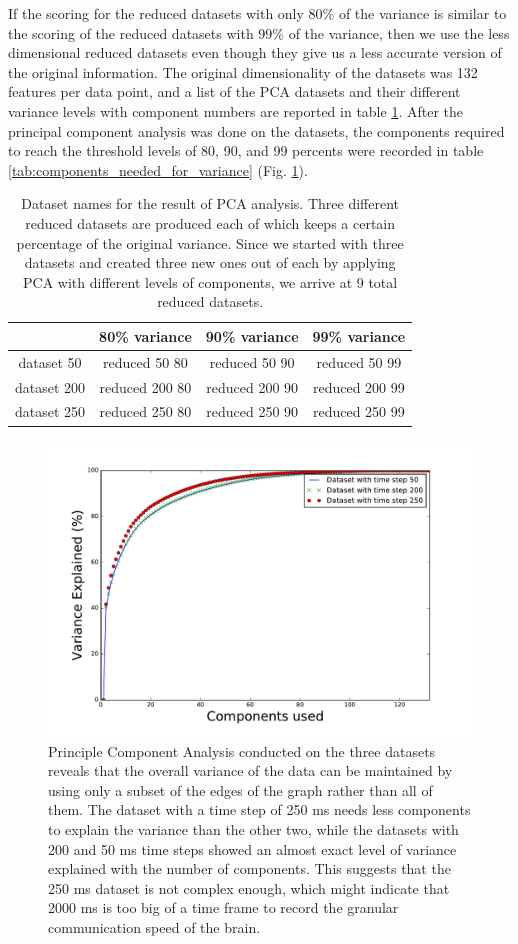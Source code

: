 \documentclass[journal,12pt,onecolumn,draftclsnofoot]{IEEEtran}  %
\begin{document}
 If the scoring for the reduced datasets with only 80\% of the variance is similar to the scoring of the reduced datasets with 99\% of the variance, then we use the less dimensional reduced datasets even though they give us a less accurate version of the original information. The original dimensionality of the datasets was 132 features per data point, and a list of the PCA datasets and their different variance levels with component numbers are reported in table \ref{tab:pca_datasets}. After the principal component analysis was done on the datasets, the components required to reach the threshold levels of 80, 90, and 99 percents were recorded in table \ref{tab:components_needed_for_variance} (Fig. \ref{fig:pca_analysis_variance}).


\begin{table}[H]
\centering
\caption{Dataset names for the result of PCA analysis. Three different reduced datasets are produced each of which keeps a certain percentage of the original variance. Since we started with three datasets and created three new ones out of each by applying PCA with different levels of components, we arrive at 9 total reduced datasets.}
\label{tab:pca_datasets}
\begin{tabular}{|c|c|c|c|}
\hline
  &  80\% variance &  90\% variance & 99\% variance \\ \hline
 
dataset 50 & reduced 50 80 & reduced 50 90 & reduced 50 99  \\ \hline
dataset 200 & reduced 200 80 & reduced 200 90 & reduced 200 99  \\ \hline
dataset 250 & reduced 250 80 & reduced 250 90 & reduced 250 99  \\ \hline
\end{tabular}
\end{table}


\begin{figure}[H]
  \centering
  \includegraphics[width=0.55\linewidth]{figures/variance_explained_with_pca.pdf}
  \caption{Principle Component Analysis conducted on the three datasets reveals that the overall variance of the data can be maintained by using only a subset of the edges of the graph rather than all of them. The dataset with a time step of 250 ms needs less components to explain the variance than the other two, while the datasets with 200 and 50 ms time steps showed an almost exact level of variance explained with the number of components. This suggests that the 250 ms dataset is not complex enough, which might indicate that 2000 ms is too big of a time frame to record the granular communication speed of the brain.}
  \label{fig:pca_analysis_variance}
\end{figure}
\end{document}
